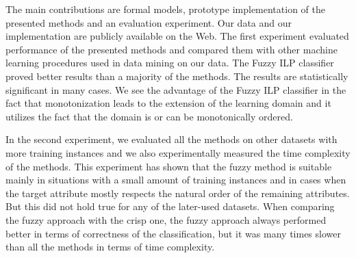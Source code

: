 The main contributions are formal models, prototype implementation of the presented methods and an evaluation experiment. Our data and our implementation are publicly available on the Web. The first experiment evaluated performance of the presented methods and compared them with other machine learning procedures used in data mining on our data. The Fuzzy ILP classifier proved better results than a majority of the methods. The results are statistically significant in many cases. 
We see the advantage of the Fuzzy ILP classifier in the fact that monotonization leads to the extension of the learning domain and it utilizes the fact that the domain is or can be monotonically ordered.

In the second experiment, we evaluated all the methods on other datasets with more training instances and we also experimentally measured the time complexity of the methods. This experiment has shown that the fuzzy method is suitable mainly in situations with a small amount of training instances and in cases when the target attribute mostly respects the natural order of the remaining attributes. But this did not hold true for any of the later-used datasets. When comparing the fuzzy approach with the crisp one, the fuzzy approach always performed better in terms of correctness of the classification, but it was many times slower than all the methods in terms of time complexity.
